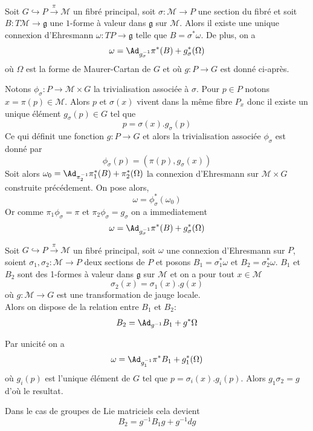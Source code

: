 \begin{thm}
Soit $G \hookrightarrow P \overset{\pi}{\to} \mathcal{M}$ un fibré principal, soit $\sigma: \mathcal{M} \to P$ une section du fibré et soit $B: T\mathcal{M} \to \mathfrak{g}$ une $1$-forme à valeur dans $\mathfrak{g}$ sur $\mathcal{M}$. Alors il existe une unique connexion d'Ehresmann $\omega: TP \to \mathfrak{g}$ telle que $B = \sigma^*\omega$. De plus, on a
$$\omega = \Ad_{g_\sigma^{-1}}\pi^*(B)+g_\sigma^*(\Omega)$$
où $\Omega$ est la forme de Maurer-Cartan de $G$ et où $g: P \to G$ est donné ci-après.
\end{thm}
\begin{preu}
Notons $\phi_\sigma: P\to \mathcal{M}\times G$ la trivialisation associée à $\sigma$. Pour $p\in P$ notons $x = \pi(p)\in \mathcal{M}$. Alors $p$ et $\sigma(x)$ vivent dans la même fibre $P_x$ donc il existe un unique élément $g_\sigma(p)\in G$ tel que
$$p = \sigma(x).g_\sigma(p)$$
Ce qui définit une fonction $g: P\to G$ et alors la trivialisation associée $\phi_\sigma$ est donné par
$$\phi_\sigma(p) = (\pi(p), g_\sigma(x))$$
Soit alors $\omega_0 = \Ad_{\pi_2^{-1}}\pi_1^*(B) + \pi_2^*(\Omega)$ la connexion d'Ehresmann sur $\mathcal{M}\times G$ construite précédement. On pose alors,
$$\omega = \phi_\sigma^*(\omega_0)$$
Or comme $\pi_1\phi_\sigma = \pi$ et $\pi_2\phi_\sigma = g_\sigma$ on a immediatement 
$$\omega = \Ad_{g_\sigma^{-1}}\pi^*(B)+g_\sigma^*(\Omega)$$
\end{preu}

\begin{thm}
Soit $G \hookrightarrow P \overset{\pi}{\to} \mathcal{M}$ un fibré principal, soit $\omega$ une connexion d'Ehresmann sur $P$, soient $\sigma_1, \sigma_2:\mathcal{M}\to P$ deux sections de $P$ et posons $B_1 = \sigma_1^*\omega$ et $B_2 = \sigma_2^*\omega$. $B_1$ et $B_2$ sont des 1-formes à valeur dans $\mathfrak{g}$ sur $\mathcal{M}$ et on a pour tout $x\in \mathcal{M}$ 
$$\sigma_2(x) = \sigma_1(x).g(x)$$
où $g:\mathcal{M} \to G$ est une transformation de jauge locale. \\
Alors on dispose de la relation entre $B_1$ et $B_2$:
$$B_2 = \Ad_{g^{-1}}B_1+g^*\Omega$$
\end{thm}
\begin{preu}
Par unicité on a
$$\omega = \Ad_{g_1^{-1}}\pi^*B_1+g_1^*(\Omega)$$
où $g_i(p)$ est l'unique élément de $G$ tel que $p = \sigma_i(x).g_i(p)$.
Alors $g_1\sigma_2 = g$ d'où le resultat.
\end{preu}

\begin{rem}
Dans le cas de groupes de Lie matriciels cela devient
$$B_2 = g^{-1}B_1g + g^{-1}dg$$
\end{rem}

